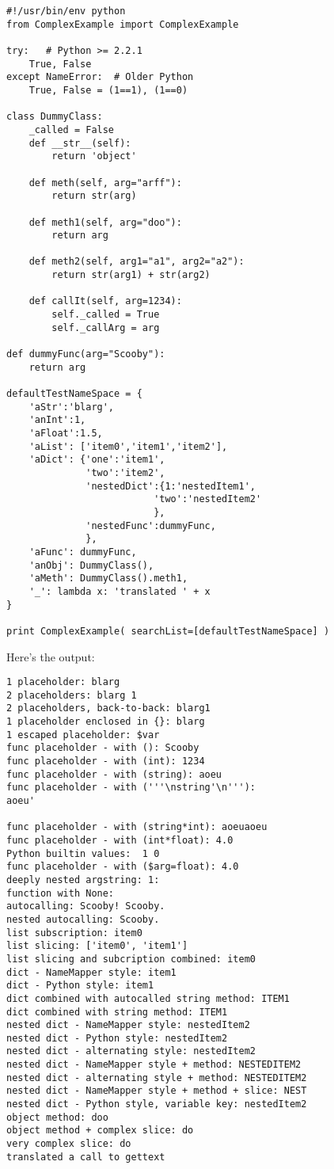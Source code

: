 \begin{verbatim}
#!/usr/bin/env python
from ComplexExample import ComplexExample

try:   # Python >= 2.2.1
    True, False
except NameError:  # Older Python
    True, False = (1==1), (1==0)

class DummyClass:
    _called = False
    def __str__(self):
        return 'object'

    def meth(self, arg="arff"):
        return str(arg)

    def meth1(self, arg="doo"):
        return arg

    def meth2(self, arg1="a1", arg2="a2"):
        return str(arg1) + str(arg2)

    def callIt(self, arg=1234):
        self._called = True
        self._callArg = arg

def dummyFunc(arg="Scooby"):
    return arg

defaultTestNameSpace = {
    'aStr':'blarg',
    'anInt':1,
    'aFloat':1.5,
    'aList': ['item0','item1','item2'],
    'aDict': {'one':'item1',
              'two':'item2',
              'nestedDict':{1:'nestedItem1',
                          'two':'nestedItem2'
                          },
              'nestedFunc':dummyFunc,
              },
    'aFunc': dummyFunc,
    'anObj': DummyClass(),
    'aMeth': DummyClass().meth1,
    '_': lambda x: 'translated ' + x
}

print ComplexExample( searchList=[defaultTestNameSpace] )
\end{verbatim}

Here's the output:

\begin{verbatim}
1 placeholder: blarg
2 placeholders: blarg 1
2 placeholders, back-to-back: blarg1
1 placeholder enclosed in {}: blarg
1 escaped placeholder: $var
func placeholder - with (): Scooby
func placeholder - with (int): 1234
func placeholder - with (string): aoeu
func placeholder - with ('''\nstring'\n'''): 
aoeu'

func placeholder - with (string*int): aoeuaoeu
func placeholder - with (int*float): 4.0
Python builtin values:  1 0
func placeholder - with ($arg=float): 4.0
deeply nested argstring: 1:
function with None: 
autocalling: Scooby! Scooby.
nested autocalling: Scooby.
list subscription: item0
list slicing: ['item0', 'item1']
list slicing and subcription combined: item0
dict - NameMapper style: item1
dict - Python style: item1
dict combined with autocalled string method: ITEM1
dict combined with string method: ITEM1
nested dict - NameMapper style: nestedItem2
nested dict - Python style: nestedItem2
nested dict - alternating style: nestedItem2
nested dict - NameMapper style + method: NESTEDITEM2
nested dict - alternating style + method: NESTEDITEM2
nested dict - NameMapper style + method + slice: NEST
nested dict - Python style, variable key: nestedItem2
object method: doo
object method + complex slice: do
very complex slice: do
translated a call to gettext

\end{verbatim}

